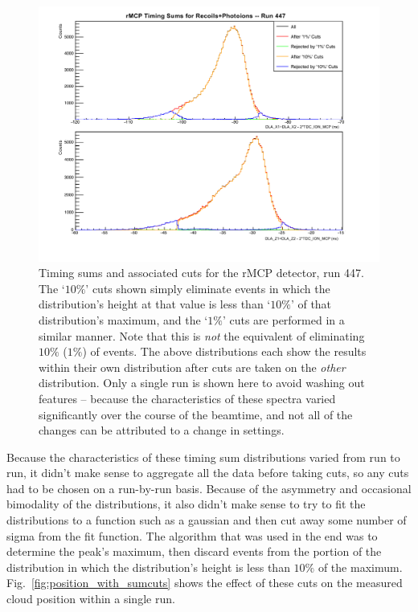 \begin{figure}[h!tb]
	\centering
	\includegraphics[width=.999\linewidth]
	{Figures/rMCP_sumcuts_447.pdf}
	\caption[Timing sums for the rMCP, run 447.]{Timing sums and associated cuts for the rMCP detector, run 447.  The `$10\%$' cuts shown simply eliminate events in which the distribution's height at that value is less than `$10\%$' of that distribution's maximum, and the `$1\%$' cuts are performed in a similar manner.  Note that this is \emph{not} the equivalent of eliminating $10\%$ ($1\%$) of events. The above distributions each show the results within their own distribution after cuts are taken on the \emph{other} distribution.  Only a single run is shown here to avoid washing out features -- because the characteristics of these spectra varied significantly over the course of the beamtime, and not all of the changes can be attributed to a change in settings.  
	}	
	\label{fig:sumcuts}
\end{figure}

Because the characteristics of these timing sum distributions varied from run to run, it didn't make sense to aggregate all the data before taking cuts, so any cuts had to be chosen on a run-by-run basis.  Because of the asymmetry and occasional bimodality of the distributions, it also didn't make sense to try to fit the distributions to a function such as a gaussian and then cut away some number of sigma from the fit function.  The algorithm that was used in the end was to determine the peak's maximum, then discard events from the portion of the distribution in which the distribution's height is less than $10\%$ of the maximum.  Fig.~\ref{fig:position_with_sumcuts} shows the effect of these cuts on the measured cloud position within a single run.

